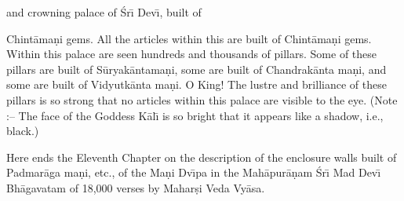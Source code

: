and crowning palace of \'Sr\={\i} Dev\={\i}, built of

Chint\=ama\d{n}i gems. All the articles within this are built of Chint\=ama\d{n}i gems. Within this palace are seen hundreds and thousands of pillars. Some of these pillars are built of S\=uryak\=antama\d{n}i, some are built of Chandrak\=anta ma\d{n}i, and some are built of Vidyutk\=anta ma\d{n}i. O King! The lustre and brilliance of these pillars is so strong that no articles within this palace are visible to the eye. (Note :-- The face of the Goddess K\=al\={\i} is so bright that it appears like a shadow, i.e., black.)

Here ends the Eleventh Chapter on the description of the enclosure walls built of Padmar\=aga ma\d{n}i, etc., of the Ma\d{n}i Dv\={\i}pa in the Mah\=apur\=a\d{n}am \'Sr\={\i} Mad Dev\={\i} Bh\=agavatam of 18,000 verses by Mahar\d{s}i Veda Vy\=asa.



